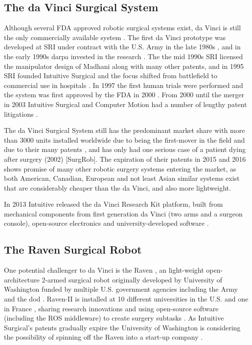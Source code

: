 \subsection{The da Vinci Surgical System}
Although several FDA approved robotic surgical systems exist, da Vinci is still the only commercially available system \citep{bib:docatadist,bib:intuitive_monopoly}. The first da Vinci prototype was developed at SRI under contract with the U.S. Army in the late 1980s \citep{bib:mddi,bib:brown_univ}, and in the early 1990s \gls{darpa} invested in the research \citep[p 74]{bib:surgical_book}. The the mid 1990s SRI licensed the manipulator design of Madhani along with many other patents, and in 1995 SRI founded Intuitive Surgical and the focus shifted from battlefield to commercial use in hospitals \citep{bib:intuitive_monopoly}.
In 1997 the first human trials were performed \citep{bib:intuitive_monopoly} %
and the system was first approved by the FDA in 2000 \citep{bib:intuitive_monopoly,bib:brown_univ}. From 2000 until the merger in 2003 Intuitive Surgical and Computer Motion had a number of lengthy patent litigations \citep{bib:intuitive_monopoly,bib:telesurg_history}.




The da Vinci Surgical System still has the predominant market share with more than 3000 units installed worldwide due to being the first-mover in the field and due to their many patents \citep{bib:intuitive_monopoly}, and has only had one serious case of a patient dying after surgery (2002) [SurgRob].
The expiration of their patents in 2015 and 2016 \citep{bib:intuitive_monopoly} shows promise of many other robotic surgery systems entering the market, as both American, Canadian, European and not least Asian similar systems exist that are considerably cheaper than the da Vinci, and also more lightweight.

In 2013 Intuitive released the da Vinci Research Kit platform, built from mechanical components from first generation da Vinci (two arms and a surgeon console), open-source electronics and university-developed software \citep{bib:raven_observ}.

\subsection{The Raven Surgical Robot}
One potential challenger to da Vinci is the Raven \cite{bib:mddi}, an light-weight open-architecture 2-armed surgical robot \citep{bib:raven_debride,bib:raven_ii} originally developed by University of Washington funded by multiple U.S. government agencies including the Army and the \gls{dod} \citep[p 27]{bib:surgical_book}.
Raven-II is installed at 10 different universities in the U.S. and one in France \citep{bib:raven_ii}, sharing research innovations and using open-source software (including the ROS middleware) to create surgery subtasks \citep{bib:raven_debride}. 
As Intuitive Surgical's patents gradually expire the University of Washington is considering the possibility of spinning off the Raven into a start-up company \citep{bib:economist}.


